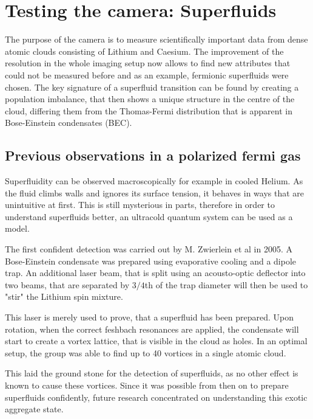 \chapter{Testing the camera: Superfluids}
The purpose of the camera is to measure scientifically important data from dense atomic clouds consisting of Lithium and Caesium.
The improvement of the resolution in the whole imaging setup now allows to find new attributes that could not be measured before and as an example, fermionic superfluids were chosen. The key signature of a superfluid transition can be found by creating a population imbalance, that then shows a unique structure in the centre of the cloud, differing them from the Thomas-Fermi distribution that is apparent in Bose-Einstein condensates (BEC).

\section{Previous observations in a polarized fermi gas}

Superfluidity can be observed macroscopically for example in cooled Helium. As the fluid climbs walls and ignores its surface tension, it behaves in ways that are unintuitive at first. This is still mysterious in parts, therefore in order to understand superfluids better, an ultracold quantum system can be used as a model.

The first confident detection was carried out by M. Zwierlein et al in 2005. A Bose-Einstein condensate was prepared using evaporative cooling and a dipole trap. An additional laser beam, that is split using an acousto-optic deflector into two beams, that are separated by $3/4$th of the trap diameter will then be used to "stir" the Lithium spin mixture.

This laser is merely used to prove, that a superfluid has been prepared. Upon rotation, when the correct feshbach resonances are applied, the condensate will start to create a vortex lattice, that is visible in the cloud as holes. In an optimal setup, the group was able to find up to 40 vortices in a single atomic cloud.

This laid the ground stone for the detection of superfluids, as no other effect is known to cause these vortices.
Since it was possible from then on to prepare superfluids confidently, future research concentrated on understanding this exotic aggregate state.

